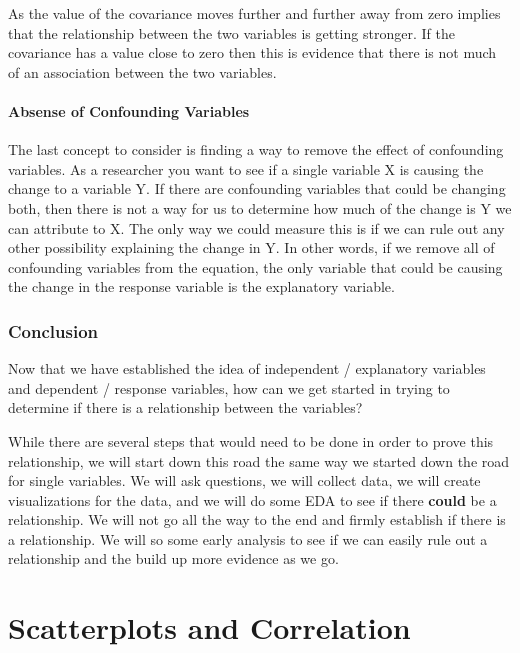 \documentclass[
  letterpaper,
  DIV=11,
  numbers=noendperiod]{scrreprt}
\begin{document}
As the value of the covariance moves further and further away from zero
implies that the relationship between the two variables is getting
stronger. If the covariance has a value close to zero then this is
evidence that there is not much of an association between the two
variables.

\subsubsection*{Absense of Confounding
Variables}\label{absense-of-confounding-variables}

The last concept to consider is finding a way to remove the effect of
confounding variables. As a researcher you want to see if a single
variable X is causing the change to a variable Y. If there are
confounding variables that could be changing both, then there is not a
way for us to determine how much of the change is Y we can attribute to
X. The only way we could measure this is if we can rule out any other
possibility explaining the change in Y. In other words, if we remove all
of confounding variables from the equation, the only variable that could
be causing the change in the response variable is the explanatory
variable.

\subsection*{Conclusion}\label{conclusion-1}

Now that we have established the idea of independent / explanatory
variables and dependent / response variables, how can we get started in
trying to determine if there is a relationship between the variables?

While there are several steps that would need to be done in order to
prove this relationship, we will start down this road the same way we
started down the road for single variables. We will ask questions, we
will collect data, we will create visualizations for the data, and we
will do some EDA to see if there \textbf{could} be a relationship. We
will not go all the way to the end and firmly establish if there is a
relationship. We will so some early analysis to see if we can easily
rule out a relationship and the build up more evidence as we go.


\chapter*{Scatterplots and
Correlation}\label{scatterplots-and-correlation}
\end{document}
